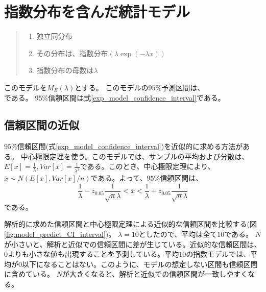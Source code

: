 \section{指数分布を含んだ統計モデル}
\begin{quote}
    \begin{enumerate}[(1)]
    \item 独立同分布
    \item その分布は、指数分布$(\lambda\exp{(-\lambda x)})$
    \item 指数分布の母数は$\lambda$
    \end{enumerate}
\end{quote}
このモデルを$M_E(\lambda)$とする。
このモデルの$95\%$予測区間は、
\begin{equation*}
    [\frac{1}{\lambda} \log\frac{1}{1-\alpha/2} ,\frac{1}{\lambda}\log\frac{\alpha}{2} ]
\end{equation*}
である。
$95\%$信頼区間は式\ref{exp_model_confidence_interval}である。


\subsection{信頼区間の近似}
$95\%$信頼区間(式\ref{exp_model_confidence_interval})を近似的に求める方法がある。
中心極限定理を使う。このモデルでは、サンプルの平均および分散は、$E[x]=\frac{1}{\lambda},Var[x]=\frac{1}{\lambda^2}$である。このとき、中心極限定理により、$\bar{x}\sim N(E[x],Var[x]/n)$である。よって、$95\%$信頼区間は、
\begin{equation*}
\frac{1}{\lambda}-z_{0.05}\frac{1}{\sqrt{n}\lambda}<\bar{x}<\frac{1}{\lambda}+z_{0.05}\frac{1}{\sqrt{n}\lambda}
\end{equation*}
である。

解析的に求めた信頼区間と中心極限定理による近似的な信頼区間を比較する(図\ref{fig:model_predict_CI_interval})。
$\lambda=10$としたので、平均は全て$10$である。
$N$が小さいと、解析と近似での信頼区間に差が生じている。近似的な信頼区間は、$0$よりも小さな値も出現することを予測している。平均$10$の指数モデルでは、平均が$0$以下になることはない。このように、モデルの想定しない区間も信頼区間に含めている。
$N$が大きくなると、解析と近似での信頼区間が一致しやすくなる。

